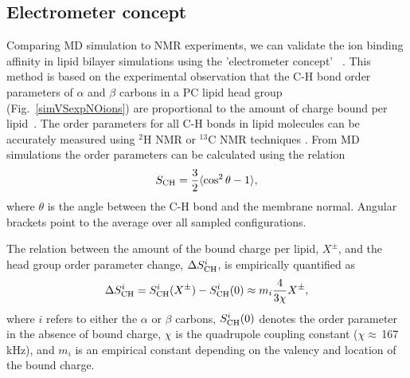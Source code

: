 \documentclass[journal=jpcbfk,manuscript=article]{achemso}
\begin{document}
\subsection{Electrometer concept} \label{section:electrometer}
Comparing MD simulation to NMR experiments, we can validate the ion
binding affinity in lipid bilayer simulations using the 'electrometer concept'~ \cite{seelig87, catte16}.
This method is based on the experimental observation that the C-H bond order parameters of $\alpha$ and $\beta$ carbons in a PC lipid head group (Fig.~\ref{simVSexpNOions}) are proportional to the amount of charge bound per lipid~\cite{seelig87}.
The order parameters for all C-H bonds in lipid molecules can be accurately measured using $^2$H NMR or $^{13}$C NMR techniques \cite{ollila16}. From MD simulations the order parameters can be calculated using the relation
\begin{equation}\label{OP}
S_{\rm CH}=\frac{3}{2}\langle \cos^2\theta -1 \rangle,
\end{equation}
where $\theta$ is the angle between the C-H bond and the membrane normal. Angular brackets point to the average over all sampled configurations.

The relation between the amount of the bound charge per lipid, $X^\pm$, and the head group order parameter change, $\Delta S_{\rm{CH}}^{i}$, is empirically quantified as~\cite{seelig87,ferreira16}
\begin{equation}\label{OPchangeEQ}
\Delta S_{\rm{CH}}^{i}= S_{\rm{CH}}^{i}(X^\pm)-S_{\rm{CH}}^{i}(0) \approx m_i \frac{4 }{3\chi}X^\pm,
\end{equation}
where $i$ refers to either the $\alpha$ or $\beta$ carbons, $S_{\rm{CH}}^{i}(0)$ denotes the order parameter in the absence of bound charge, $\chi$ is the quadrupole coupling constant ($\chi \approx$\,167\,kHz), and $m_i$ is an empirical constant depending on the valency and location of the bound charge.
\end{document}
